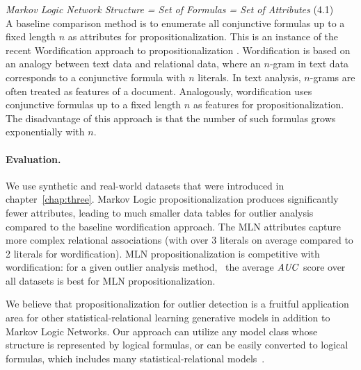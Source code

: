 			  {  \em Markov Logic Network Structure = Set of Formulas = Set of Attributes }  (4.1)\\


		A baseline comparison method is to enumerate all conjunctive formulas up to a fixed length $n$ as attributes for propositionalization.  This is an instance of the recent Wordification approach to propositionalization \cite{Lavrac13}. 
		Wordification is based on an analogy between text data and relational data, where an $n$-gram in text data corresponds to a conjunctive formula with $n$ literals. In text analysis, $n$-grams are often treated as features of a document. 
		Analogously, wordification uses conjunctive formulas up to a fixed length $n$ as features for propositionalization. 
		The disadvantage of this approach is that the number of such formulas grows exponentially with $n$. 
		
		\paragraph{Evaluation.}%
		We use synthetic and real-world datasets that were introduced in chapter~\ref{chap:three}. Markov Logic propositionalization produces significantly fewer attributes, leading to much smaller  data tables for outlier analysis compared to the baseline wordification approach. The MLN attributes capture more complex relational associations 
		(with over 3 literals on average compared to 2 literals for wordification). 
		MLN propositionalization is competitive with wordification: for a given outlier analysis method,~%
		the average $\it{AUC}$ score over all datasets is best for MLN propositionalization.
		
		We believe that propositionalization for outlier detection is a fruitful application area for other statistical-relational learning generative models in addition to Markov Logic Networks. 
		Our approach can  utilize %
		any model class whose structure is represented by logical formulas, or can be easily converted to logical formulas, which includes many statistical-relational models~\cite{Ravkic2015,Cussens2012,Kersting2007,SRL2007}.
		
